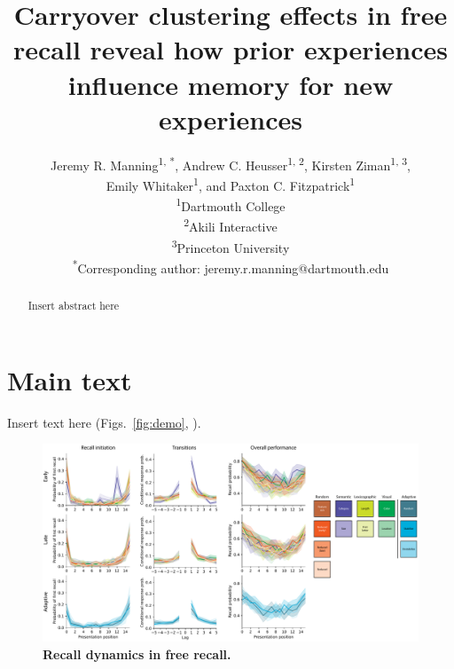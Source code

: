 \documentclass[10pt]{article}
\title{Carryover clustering effects in free recall reveal how prior experiences influence memory for new experiences}
\author{Jeremy R. Manning\textsuperscript{1, *}, Andrew C. Heusser\textsuperscript{1, 2}, Kirsten Ziman\textsuperscript{1, 3},\\Emily Whitaker\textsuperscript{1}, and Paxton C. Fitzpatrick\textsuperscript{1}\\\textsuperscript{1}Dartmouth College\\\textsuperscript{2}Akili Interactive\\\textsuperscript{3}Princeton University\\\textsuperscript{*}Corresponding author: jeremy.r.manning@dartmouth.edu}
\date{}
\begin{document}
\maketitle

\begin{abstract}
Insert abstract here
\end{abstract}


\section*{Main text}
Insert text here (Figs.~\ref{fig:demo}, \demo).

\begin{figure}[tp]
\centering
\includegraphics[width=\textwidth]{figures/recall_dynamics}
\caption{\textbf{Recall dynamics in free recall.}}
\label{fig:recall-dynamics}
\end{figure}



\end{document}
